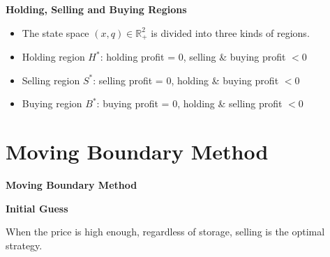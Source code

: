 \documentclass{beamer}
\begin{document}
\begin{frame}
{\bf Holding, Selling and Buying Regions}

\begin{itemize}
  \item The state space $(x,q) \in \mathbb{R}^2_+$ is divided into three kinds of regions.
  \item {\small Holding region $H^*$: holding profit = 0, selling \& buying profit $<0$}
  \item {\small Selling region $S^*$: selling profit = 0, holding \& buying profit $<0$}
  \item {\small Buying region $B^*$: buying profit = 0, holding \& selling profit $<0$}
\end{itemize}

\end{frame}

\section{Moving Boundary Method}
\begin{frame}
{\bf Moving Boundary Method}


\end{frame}

\begin{frame}
{\bf Initial Guess}

\begin{theorem}
When the price is high enough, regardless of storage, selling is the optimal strategy.
\end{theorem}


\end{frame}
\end{document}
